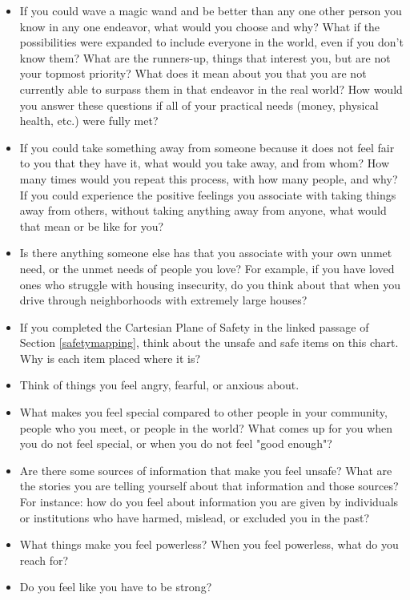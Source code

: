 \documentclass[12pt,letterpaper]{book}
\begin{document}
\begin{itemize}
    \item If you could wave a magic wand and be better than any one other person you know in any one endeavor, what would you choose and why? What if the possibilities were expanded to include everyone in the world, even if you don't know them? What are the runners-up, things that interest you, but are not your topmost priority? What does it mean about you that you are not currently able to surpass them in that endeavor in the real world? How would you answer these questions if all of your practical needs (money, physical health, etc.) were fully met?
    \item If you could take something away from someone because it does not feel fair to you that they have it, what would you take away, and from whom? How many times would you repeat this process, with how many people, and why? If you could experience the positive feelings you associate with taking things away from others, without taking anything away from anyone, what would that mean or be like for you?
    \item Is there anything someone else has that you associate with your own unmet need, or the unmet needs of people you love? For example, if you have loved ones who struggle with housing insecurity, do you think about that when you drive through neighborhoods with extremely large houses?
    \item If you completed the Cartesian Plane of Safety in the linked passage of Section \ref{safetymapping}, think about the unsafe and safe items on this chart. Why is each item placed where it is?
    \item Think of things you feel angry, fearful, or anxious about. 
    \item What makes you feel special compared to other people in your community, people who you meet, or people in the world? What comes up for you when you do not feel special, or when you do not feel "good enough"?
    \item Are there some sources of information that make you feel unsafe? What are the stories you are telling yourself about that information and those sources? For instance: how do you feel about information you are given by individuals or institutions who have harmed, mislead, or excluded you in the past?
    \item What things make you feel powerless? When you feel powerless, what do you reach for?
    \item Do you feel like you have to be strong?

\end{itemize}
\end{document}
